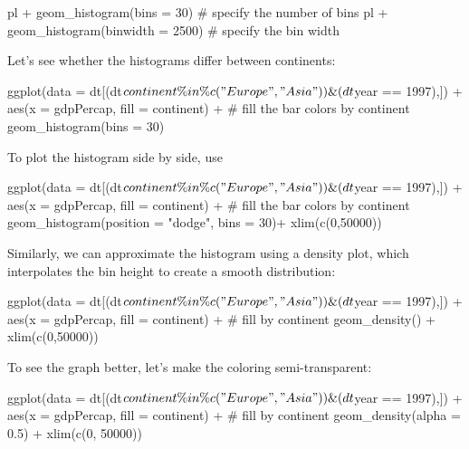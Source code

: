 \documentclass[
  letterpaper,
  DIV=11,
  numbers=noendperiod]{scrreprt}
\newenvironment{Shaded}{\begin{snugshade}}{\end{snugshade}}
\newcommand{\NormalTok}[1]{\textcolor[rgb]{0.00,0.23,0.31}{#1}}
\begin{document}
\begin{Shaded}
\begin{Highlighting}[]
\NormalTok{pl + geom\_histogram(bins = 30) \# specify the number of bins}
\NormalTok{pl + geom\_histogram(binwidth = 2500) \# specify the bin width}
\end{Highlighting}
\end{Shaded}

Let's see whether the histograms differ between continents:

\begin{Shaded}
\begin{Highlighting}[]
\NormalTok{ggplot(data = dt[(dt$continent \%in\% c("Europe", "Asia")) \& (dt$year == 1997),]) + }
\NormalTok{  aes(x = gdpPercap, fill = continent) + \# fill the bar colors by continent}
\NormalTok{  geom\_histogram(bins = 30)}
\end{Highlighting}
\end{Shaded}

To plot the histogram side by side, use

\begin{Shaded}
\begin{Highlighting}[]
\NormalTok{ggplot(data = dt[(dt$continent \%in\% c("Europe", "Asia")) \& (dt$year == 1997),]) + }
\NormalTok{  aes(x = gdpPercap, fill = continent) + \# fill the bar colors by continent}
\NormalTok{  geom\_histogram(position = "dodge", bins = 30)+ }
\NormalTok{  xlim(c(0,50000))}
\end{Highlighting}
\end{Shaded}

Similarly, we can approximate the histogram using a density plot, which
interpolates the bin height to create a smooth distribution:

\begin{Shaded}
\begin{Highlighting}[]
\NormalTok{ggplot(data = dt[(dt$continent \%in\% c("Europe", "Asia")) \& (dt$year == 1997),]) + }
\NormalTok{  aes(x = gdpPercap, fill = continent) + \# fill by continent}
\NormalTok{  geom\_density() + xlim(c(0,50000))}
\end{Highlighting}
\end{Shaded}

To see the graph better, let's make the coloring semi-transparent:

\begin{Shaded}
\begin{Highlighting}[]
\NormalTok{ggplot(data = dt[(dt$continent \%in\% c("Europe", "Asia")) \& (dt$year == 1997),]) + }
\NormalTok{  aes(x = gdpPercap, fill = continent) + \# fill by continent}
\NormalTok{  geom\_density(alpha = 0.5) + xlim(c(0, 50000))}
\end{Highlighting}
\end{Shaded}
\end{document}
